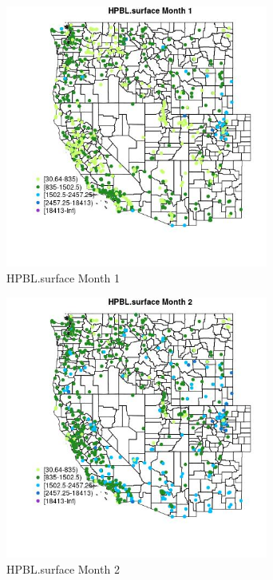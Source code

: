 \begin{figure} 
\centering  
\includegraphics[width=0.77\textwidth]{Code_Outputs/Report_ML_input_PM25_Step4_part_f_de_duplicated_aves_prioritize_24hr_obswNAs_MapObsMo1HPBLsurface.jpg} 
\caption{\label{fig:Report_ML_input_PM25_Step4_part_f_de_duplicated_aves_prioritize_24hr_obswNAsMapObsMo1HPBLsurface}HPBL.surface Month 1} 
\end{figure} 
 

\begin{figure} 
\centering  
\includegraphics[width=0.77\textwidth]{Code_Outputs/Report_ML_input_PM25_Step4_part_f_de_duplicated_aves_prioritize_24hr_obswNAs_MapObsMo2HPBLsurface.jpg} 
\caption{\label{fig:Report_ML_input_PM25_Step4_part_f_de_duplicated_aves_prioritize_24hr_obswNAsMapObsMo2HPBLsurface}HPBL.surface Month 2} 
\end{figure} 
 

